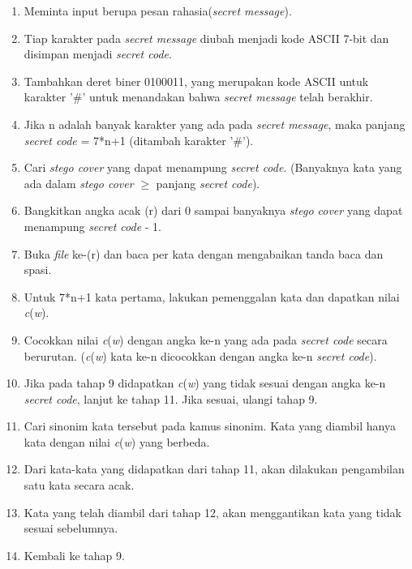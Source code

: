 \begin{enumerate}
	\item Meminta input berupa pesan rahasia(\textit{secret message}).
	\item Tiap karakter pada \textit{secret message} diubah menjadi kode ASCII 7-bit dan disimpan menjadi \textit{secret code}.
	\item Tambahkan deret biner 0100011, yang merupakan kode ASCII untuk karakter '\#' untuk menandakan bahwa \textit{secret message} telah berakhir.
	\item Jika n adalah banyak karakter yang ada pada \textit{secret message}, maka panjang \textit{secret code} = 7*n+1 (ditambah karakter '\#').
	\item Cari \textit{stego cover} yang dapat menampung \textit{secret code}. (Banyaknya kata yang ada dalam \textit{stego cover} $\geq$ panjang \textit{secret code}).
	\item Bangkitkan angka acak (r) dari 0 sampai banyaknya \textit{stego cover} yang dapat menampung \textit{secret code} - 1. 
	\item Buka \textit{file} ke-(r) dan baca per kata dengan mengabaikan tanda baca dan spasi.
	\item Untuk 7*n+1 kata pertama, lakukan pemenggalan kata dan dapatkan nilai \textit{c}(\textit{w}).
	\item Cocokkan nilai \textit{c}(\textit{w}) dengan angka ke-n yang ada pada \textit{secret code} secara berurutan. (\textit{c}(\textit{w}) kata ke-n dicocokkan dengan angka ke-n \textit{secret code}).
	\item Jika pada tahap 9 didapatkan \textit{c}(\textit{w}) yang tidak sesuai dengan angka ke-n \textit{secret code}, lanjut ke tahap 11. Jika sesuai, ulangi tahap 9.
	\item Cari sinonim kata tersebut pada kamus sinonim. Kata yang diambil hanya kata dengan nilai \textit{c}(\textit{w}) yang berbeda.
	\item Dari kata-kata yang didapatkan dari tahap 11, akan dilakukan pengambilan satu kata secara acak.
	\item Kata yang telah diambil dari tahap 12, akan menggantikan kata yang tidak sesuai sebelumnya.
	\item Kembali ke tahap 9.
\end{enumerate}

